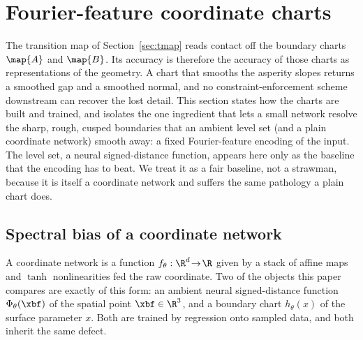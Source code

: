 \section{Fourier-feature coordinate charts}\label{sec:fourier}

The transition map of Section~\ref{sec:tmap} reads contact off the boundary charts $\map{A}$ and
$\map{B}$. Its accuracy is therefore the accuracy of those charts as representations of the geometry. A
chart that smooths the asperity slopes returns a smoothed gap and a smoothed normal, and no
constraint-enforcement scheme downstream can recover the lost detail. This section states how the charts
are built and trained, and isolates the one ingredient that lets a small network resolve the sharp, rough,
cusped boundaries that an ambient level set (and a plain coordinate network) smooth away: a fixed
Fourier-feature encoding of the input. The level set, a neural signed-distance function, appears here only
as the baseline that the encoding has to beat. We treat it as a fair baseline, not a strawman, because it is
itself a coordinate network and suffers the same pathology a plain chart does.

\subsection{Spectral bias of a coordinate network}\label{sec:spectral}

A coordinate network is a function $f_\theta:\R^d\!\to\!\R$ given by a stack of affine maps and $\tanh$
nonlinearities fed the raw coordinate. Two of the objects this paper compares are exactly of this form:
an ambient neural signed-distance function $\Phi_\theta(\xbf)$ of the spatial point $\xbf\in\R^3$, and a
boundary chart $h_\theta(x)$ of the surface parameter $x$. Both are trained by regression onto sampled
data, and both inherit the same defect.

